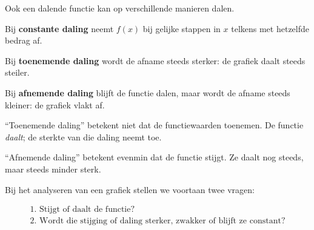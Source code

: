 \documentclass{ximera}
\begin{document}


Ook een dalende functie kan op verschillende manieren dalen.

\begin{definitie}
Bij \textbf{constante daling} neemt \(f(x)\) bij gelijke stappen in \(x\)
telkens met hetzelfde bedrag af.

Bij \textbf{toenemende daling} wordt de afname steeds sterker:
de grafiek daalt steeds steiler.

Bij \textbf{afnemende daling} blijft de functie dalen,
maar wordt de afname steeds kleiner:
de grafiek vlakt af.
\end{definitie}

\begin{center}
\end{center}

\begin{opmerking}
``Toenemende daling'' betekent niet dat de functiewaarden toenemen.
De functie \emph{daalt}; de sterkte van die daling neemt toe.

``Afnemende daling'' betekent evenmin dat de functie stijgt.
Ze daalt nog steeds, maar steeds minder sterk.
\end{opmerking}




Bij het analyseren van een grafiek stellen we voortaan twee vragen:

\[
\boxed{
\begin{array}{c}
\text{1. Stijgt of daalt de functie?}\\[1mm]
\text{2. Wordt die stijging of daling sterker, zwakker of blijft ze constant?}
\end{array}}
\]
\end{document}
